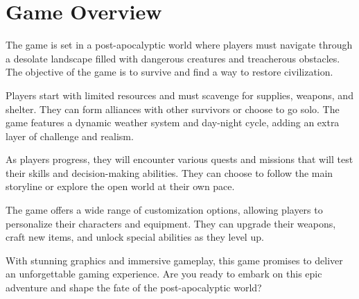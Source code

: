 
\section{Game Overview}

The game is set in a post-apocalyptic world where players must navigate through a desolate landscape filled with dangerous creatures and treacherous obstacles. The objective of the game is to survive and find a way to restore civilization.

Players start with limited resources and must scavenge for supplies, weapons, and shelter. They can form alliances with other survivors or choose to go solo. The game features a dynamic weather system and day-night cycle, adding an extra layer of challenge and realism.

As players progress, they will encounter various quests and missions that will test their skills and decision-making abilities. They can choose to follow the main storyline or explore the open world at their own pace.

The game offers a wide range of customization options, allowing players to personalize their characters and equipment. They can upgrade their weapons, craft new items, and unlock special abilities as they level up.

With stunning graphics and immersive gameplay, this game promises to deliver an unforgettable gaming experience. Are you ready to embark on this epic adventure and shape the fate of the post-apocalyptic world?